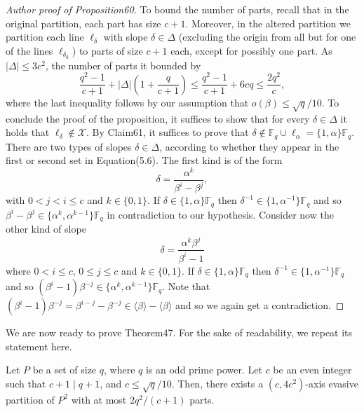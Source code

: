 \begin{proof}[Author proof of Proposition60]
To bound the number of parts, recall that in the original partition, each part has size $c+1$. Moreover, in the altered partition we partition each line $\ell_\delta$ with slope $\delta\in\Delta$ (excluding the origin from all but for one of the lines $\ell_{\delta_0}$) to parts of size $c+1$ each, except for possibly one part. As $|\Delta|\leq3c^2$, the number of parts it bounded by
\[\frac{q^2-1}{c+1}+|\Delta|\left(1+\frac q{c+1}\right)\leq\frac{q^2-1}{c+1}+6cq\leq\frac{2q^2}c,\]
where the last inequality follows by our assumption that $o(\beta)\leq\sqrt q/10$.
To conclude the proof of the proposition, it suffices to show that for every $\delta\in\Delta$ it holds that $\ell_\delta\notin\mathcal X$. By Claim61, it suffices to prove that $\delta\notin\mathbb F_q\cup\ell_\alpha=\{1,\alpha\}\mathbb F_q$. There are two types of slopes $\delta\in\Delta$, according to whether they appear in the first or second set in Equation(5.6). The first kind is of the form
\[\delta=\frac{\alpha^k}{\beta^i-\beta^j},\]
with $0<j<i\leq c$ and $k\in\{0,1\}$. If $\delta\in\{1,\alpha\}\mathbb F_q$ then $\delta^{-1}\in\{1,\alpha^{-1}\}\mathbb F_q$ and so $\beta^i-\beta^j\in\{\alpha^k,\alpha^{k-1}\}\mathbb F_q$ in contradiction to our hypothesis. Consider now the other kind of slope
\[\delta=\frac{\alpha^k\beta^j}{\beta^i-1}\]
where $0<i\leq c$, $0\leq j\leq c$ and $k\in\{0,1\}$. If $\delta\in\{1,\alpha\}\mathbb F_q$ then $\delta^{-1}\in\{1,\alpha^{-1}\}\mathbb F_q$ and so $(\beta^i-1)\beta^{-j}\in\{\alpha^k,\alpha^{k-1}\}\mathbb F_q$. Note that $(\beta^i-1)\beta^{-j}=\beta^{i-j}-\beta^{-j}\in\langle\beta\rangle-\langle\beta\rangle$ and so we again get a contradiction.
\end{proof}
We are now ready to prove Theorem47. For the sake of readability, we repeat its statement here.
\begin{nttheorem}
Let $P$ be a set of size $q$, where $q$ is an odd prime power. Let $c$ be an even integer such that $c+1\mid q+1$, and $c\leq\sqrt q/10$. Then, there exists a $(c,4c^2)$-axis evasive partition of $P^2$ with at most $2q^2/(c+1)$ parts.
\end{nttheorem}
